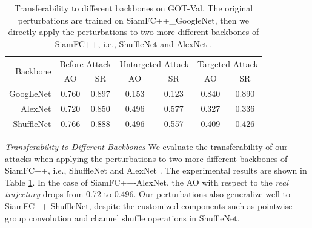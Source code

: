 \documentclass[journal]{IEEEtran}
\newcommand{\ie}{i.e.}
\begin{document}
\begin{table}[t]
  \centering
  \caption{Transferability to different backbones on GOT-Val. The original perturbations are trained on SiamFC++\_GoogleNet, then we directly apply the perturbations to two more different backbones of SiamFC++, \ie, ShuffleNet \cite{ShuffleNet} and AlexNet \cite{AlexNet}.}
  \begin{tabular}{rcccccc} 
  \toprule
  \multirow{2}{*}[-2pt]{Backbone} & \multicolumn{2}{c}{Before Attack} & \multicolumn{2}{c}{Untargeted Attack} & \multicolumn{2}{c}{Targeted Attack}  \\ 
  \cmidrule{2-7}
                            & AO    & SR                           & AO    & SR                           & AO    & SR                           \\ 
  \midrule
  GoogLeNet                 & 0.760 & 0.897                        & 0.153 & 0.123                        & 0.840 & 0.890                        \\
  AlexNet                   & 0.720 & 0.850                        & 0.496 & 0.577                        & 0.327 & 0.336                        \\
  ShuffleNet                & 0.766 & 0.888                        & 0.496 & 0.557                        & 0.409 & 0.426                       \\
  \bottomrule
  \end{tabular}
  \label{tab:backbone}
\end{table}
\textit{Transferability to Different Backbones} We evaluate the transferability of our attacks when applying the perturbations to two more different backbones of SiamFC++, \ie, ShuffleNet \cite{ShuffleNet} and AlexNet \cite{AlexNet}.
The experimental results are shown in Table \ref{tab:backbone}. In the case of SiamFC++-AlexNet, the AO with respect to the \textit{real trajectory} drops from 0.72 to 0.496. 
Our perturbations also generalize well to SiamFC++-ShuffleNet, despite the customized components such as pointwise group convolution and channel shuffle operations in ShuffleNet.
\end{document}
